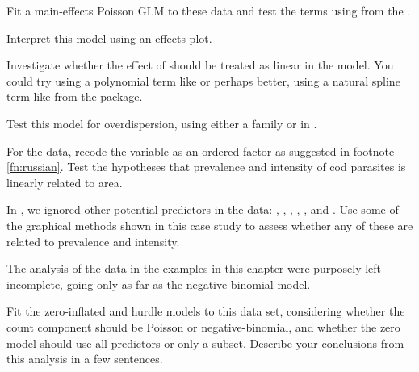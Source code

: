 \documentclass[10pt]{report}\usepackage[]{graphicx}\usepackage[]{color}
\begin{document}
\begin{Exercises}
\begin{enumerate*}
		\item Fit a main-effects Poisson GLM to these data and test the terms using
		 from the .
		\begin{ans}
		\end{ans}
		
		\item Interpret this model using an effects plot.
		\begin{ans}
		\end{ans}
		
		\item Investigate whether the effect of  should be treated as linear in the
		model.  You could try using a polynomial term like  or
		perhaps better, using a natural spline term like  from the  package.
		\begin{ans}
		\end{ans}
		
    \item 
    \begin{sloppypar} Test this model for overdispersion, using either a  family or
     in . 
    \end{sloppypar}
    \begin{ans}
    \end{ans}
    
	\end{enumerate*}		

  \exercise For the  data, recode the  variable as an ordered factor as suggested in
  footnote \ref{fn:russian}.  Test the hypotheses that prevalence and intensity of cod parasites is linearly
  related to area.
  \begin{ans}
  \end{ans}
  

  \exercise In , we ignored other potential predictors in the  data:
  , , , , , and .
  Use some of the graphical methods shown in this case study to assess whether any of these are related
  to prevalence and intensity.
  \begin{ans}
  \end{ans}
  

  \exercise The analysis of the  data in the examples in this chapter were purposely left incomplete,
  going only as far as the negative binomial model.
  \begin{enumerate*}
    \item Fit the zero-inflated and hurdle models to this data set, considering whether the count component should
    be Poisson or negative-binomial, and whether the zero model should use all predictors or only a subset.
    Describe your conclusions from this analysis in a few sentences.
    \begin{ans}
    \end{ans}
    

\end{enumerate*}
\end{Exercises}
\end{document}
